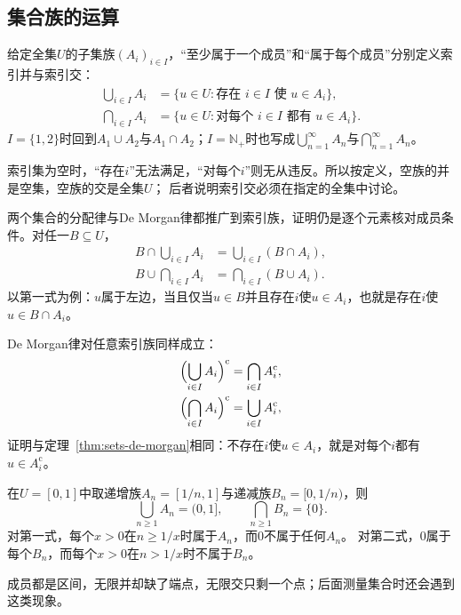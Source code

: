 \subsection{集合族的运算}
\label{sec:prelim-indexed-set-operations}

给定全集$U$的子集族$(A_i)_{i\in I}$，“至少属于一个成员”和“属于每个成员”分别定义索引并与索引交：
\begin{equation}
 \begin{aligned}
  \bigcup_{i\in I}A_i&=\{u\in U:\text{存在 }i\in I\text{ 使 }u\in A_i\},\\
  \bigcap_{i\in I}A_i&=\{u\in U:\text{对每个 }i\in I\text{ 都有 }u\in A_i\}.
 \end{aligned}
 \label{eq:sets-indexed-union-intersection}
\end{equation}
$I=\{1,2\}$时回到$A_1\cup A_2$与$A_1\cap A_2$；$I=\mathbb N_+$时也写成$\bigcup_{n=1}^\infty A_n$与$\bigcap_{n=1}^\infty A_n$。

索引集为空时，“存在$i$”无法满足，“对每个$i$”则无从违反。所以按定义，空族的并是空集，空族的交是全集$U$；
后者说明索引交必须在指定的全集中讨论。

两个集合的分配律与De Morgan律都推广到索引族，证明仍是逐个元素核对成员条件。对任一$B\subseteq U$，
\begin{equation}
 \begin{aligned}
  B\cap\bigcup_{i\in I}A_i&=\bigcup_{i\in I}(B\cap A_i),\\
  B\cup\bigcap_{i\in I}A_i&=\bigcap_{i\in I}(B\cup A_i).
 \end{aligned}
 \label{eq:sets-distributive-families}
\end{equation}
以第一式为例：$u$属于左边，当且仅当$u\in B$并且存在$i$使$u\in A_i$，也就是存在$i$使$u\in B\cap A_i$。

De Morgan律对任意索引族同样成立：
\begin{equation}
 \begin{aligned}
  \Bigl(\bigcup_{i\in I}A_i\Bigr)^{\mathrm c}&=\bigcap_{i\in I}A_i^{\mathrm c},\\
  \Bigl(\bigcap_{i\in I}A_i\Bigr)^{\mathrm c}&=\bigcup_{i\in I}A_i^{\mathrm c},
 \end{aligned}
 \label{eq:prelim-de-morgan-families}
\end{equation}
证明与定理~\ref{thm:sets-de-morgan}相同：不存在$i$使$u\in A_i$，就是对每个$i$都有$u\in A_i^{\mathrm c}$。

\begin{example}[区间族的无限并与无限交]
\label{ex:sets-interval-family-limits}
在$U=[0,1]$中取递增族$A_n=[1/n,1]$与递减族$B_n=[0,1/n)$，则
\[
 \bigcup_{n\geq1}A_n=(0,1],\qquad \bigcap_{n\geq1}B_n=\{0\}.
\]
对第一式，每个$x>0$在$n\geq1/x$时属于$A_n$，而$0$不属于任何$A_n$。
对第二式，$0$属于每个$B_n$，而每个$x>0$在$n>1/x$时不属于$B_n$。
\end{example}
成员都是区间，无限并却缺了端点，无限交只剩一个点；后面测量集合时还会遇到这类现象。

